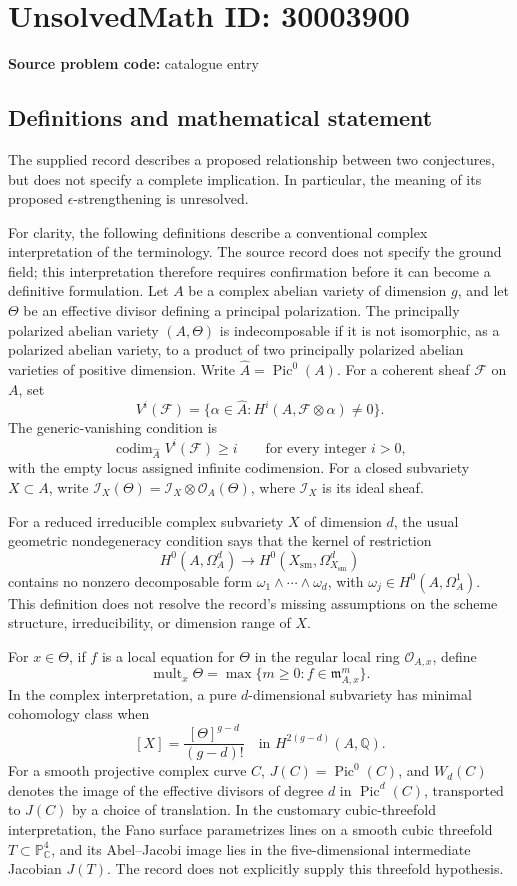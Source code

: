 \documentclass[11pt]{article}
\newcommand{\Q}{\mathbb{Q}}
\newcommand{\C}{\mathbb{C}}
\newcommand{\PP}{\mathbb{P}}
\begin{document}
\section*{UnsolvedMath ID: 30003900}
\textbf{Source problem code:} catalogue entry
\subsection{Definitions and mathematical statement}
The supplied record describes a proposed relationship between two conjectures, but does not specify a complete implication. In particular, the meaning of its proposed \(\epsilon\)-strengthening is unresolved.

For clarity, the following definitions describe a conventional complex interpretation of the terminology. The source record does not specify the ground field; this interpretation therefore requires confirmation before it can become a definitive formulation. Let \(A\) be a complex abelian variety of dimension \(g\), and let \(\Theta\) be an effective divisor defining a principal polarization. The principally polarized abelian variety \((A,\Theta)\) is indecomposable if it is not isomorphic, as a polarized abelian variety, to a product of two principally polarized abelian varieties of positive dimension. Write \(\widehat A=\operatorname{Pic}^{0}(A)\). For a coherent sheaf \(\mathcal F\) on \(A\), set
\[
V^{i}(\mathcal F)=\{\alpha\in\widehat A:H^{i}(A,\mathcal F\otimes\alpha)\ne0\}.
\]
The generic-vanishing condition is
\[
\operatorname{codim}_{\widehat A}V^{i}(\mathcal F)\ge i\qquad\text{for every integer }i>0,
\]
with the empty locus assigned infinite codimension. For a closed subvariety \(X\subset A\), write \(\mathcal I_X(\Theta)=\mathcal I_X\otimes\mathcal O_A(\Theta)\), where \(\mathcal I_X\) is its ideal sheaf.

For a reduced irreducible complex subvariety \(X\) of dimension \(d\), the usual geometric nondegeneracy condition says that the kernel of restriction
\[
H^{0}(A,\Omega_A^{d})\longrightarrow H^{0}(X_{\mathrm{sm}},\Omega_{X_{\mathrm{sm}}}^{d})
\]
contains no nonzero decomposable form \(\omega_1\wedge\cdots\wedge\omega_d\), with \(\omega_j\in H^{0}(A,\Omega_A^{1})\). This definition does not resolve the record's missing assumptions on the scheme structure, irreducibility, or dimension range of \(X\).

For \(x\in\Theta\), if \(f\) is a local equation for \(\Theta\) in the regular local ring \(\mathcal O_{A,x}\), define
\[
\operatorname{mult}_{x}\Theta=\max\{m\ge0:f\in\mathfrak m_{A,x}^{m}\}.
\]
In the complex interpretation, a pure \(d\)-dimensional subvariety has minimal cohomology class when
\[
[X]=\frac{[\Theta]^{g-d}}{(g-d)!}\quad\text{in }H^{2(g-d)}(A,\Q).
\]
For a smooth projective complex curve \(C\), \(J(C)=\operatorname{Pic}^{0}(C)\), and \(W_d(C)\) denotes the image of the effective divisors of degree \(d\) in \(\operatorname{Pic}^{d}(C)\), transported to \(J(C)\) by a choice of translation. In the customary cubic-threefold interpretation, the Fano surface parametrizes lines on a smooth cubic threefold \(T\subset\PP^{4}_{\C}\), and its Abel--Jacobi image lies in the five-dimensional intermediate Jacobian \(J(T)\). The record does not explicitly supply this threefold hypothesis.
\end{document}

